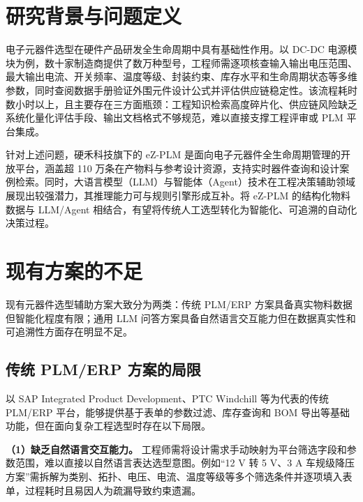 
\section{研究背景与问题定义}
电子元器件选型在硬件产品研发全生命周期中具有基础性作用。以 DC-DC 电源模块为例，数十家制造商提供了数万种型号，工程师需逐项核查输入输出电压范围、最大输出电流、开关频率、温度等级、封装约束、库存水平和生命周期状态等多维参数，同时查阅数据手册验证外围元件设计公式并评估供应链稳定性\cite{pecht2008parts}。该流程耗时数小时以上，且主要存在三方面瓶颈：工程知识检索高度碎片化、供应链风险缺乏系统化量化评估手段\cite{chen2021supplyrisk}、输出文档格式不够规范，难以直接支撑工程评审或 PLM 平台集成。

针对上述问题，硬禾科技旗下的 eZ-PLM 是面向电子元器件全生命周期管理的开放平台，涵盖超 110 万条在产物料与参考设计资源，支持实时器件查询和设计案例检索。同时，大语言模型（LLM）与智能体（Agent）技术在工程决策辅助领域展现出较强潜力\cite{xi2023rise,li2023llmagent}，其推理能力可与规则引擎形成互补。将 eZ-PLM 的结构化物料数据与 LLM/Agent 相结合，有望将传统人工选型转化为智能化、可追溯的自动化决策过程。

\section{现有方案的不足}

现有元器件选型辅助方案大致分为两类：传统 PLM/ERP 方案具备真实物料数据但智能化程度有限；通用 LLM 问答方案具备自然语言交互能力但在数据真实性和可追溯性方面存在明显不足。

\subsection{传统 PLM/ERP 方案的局限}

以 SAP Integrated Product Development、PTC Windchill 等为代表的传统 PLM/ERP 平台，能够提供基于表单的参数过滤、库存查询和 BOM 导出等基础功能，但在面向复杂工程选型时存在以下局限。

\textbf{（1）缺乏自然语言交互能力。} 工程师需将设计需求手动映射为平台筛选字段和参数范围，难以直接以自然语言表达选型意图。例如“12 V 转 5 V、3 A 车规级降压方案”需拆解为类别、拓扑、电压、电流、温度等级等多个筛选条件并逐项填入表单，过程耗时且易因人为疏漏导致约束遗漏。

